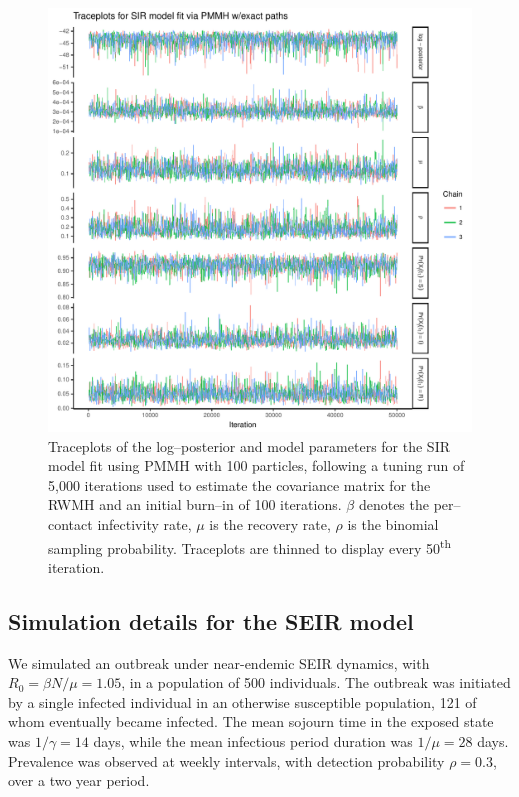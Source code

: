 \begin{figure}[htbp]
	\centering
	\includegraphics[width=0.9\linewidth]{figures/sir_pomp_exact_traceplots}
	\caption{Traceplots of the log--posterior and model parameters for the SIR model fit using PMMH with 100 particles, following a tuning run of 5,000 iterations used to estimate the covariance matrix for the RWMH and an initial burn--in of 100 iterations. $ \beta $ denotes the per--contact infectivity rate, $ \mu $ is the recovery rate, $ \rho $ is the binomial sampling probability. Traceplots are thinned to display every 50\textsuperscript{th} iteration.}
	\label{fig:sirpompexacttraceplots}
\end{figure}

\newpage
\subsection{Simulation details for the SEIR model}
\label{subsec:bda_seir_sim1_details}
We simulated an outbreak under near-endemic SEIR dynamics, with $ R_0 = \beta N / \mu = 1.05 $, in a population of 500 individuals. The outbreak was initiated by a single infected individual in an otherwise susceptible population, 121 of whom eventually became infected. The mean sojourn time in the exposed state was $ 1/\gamma = 14 $ days, while the mean infectious period duration was $ 1/\mu = 28$ days. Prevalence was observed at weekly intervals, with detection probability $ \rho = 0.3 $, over a two year period.


